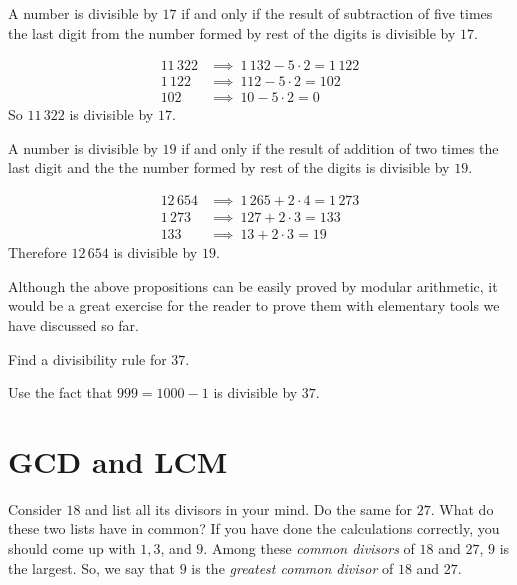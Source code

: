 \documentclass{subfile}
\begin{document}
	\begin{proposition}[Divisibility by $17$]
		A number is divisible by $17$ if and only if the result of subtraction of five times the last digit from the number formed by rest of the digits is divisible by $17$.
	\end{proposition}

	\begin{example}
		\begin{align*}
			11\, 322 & \implies \ 1\, 132 - 5 \cdot 2 = 1\, 122 \\
			1\, 122 & \implies  \ 112 - 5 \cdot 2 =   102 \\
			102 & \implies \ 10 - 5 \cdot 2 =  0
		\end{align*}
		So $11\, 322$ is divisible by $17$.
	\end{example}

	\begin{proposition}[Divisibility by $19$]
		A number is divisible by $19$ if and only if the result of addition of two times the last digit and the the number formed by rest of the digits is divisible by $19$.
	\end{proposition}

	\begin{example}
		\begin{align*}
			12 \, 654 & \implies \ 1\, 265 + 2 \cdot 4 = 1\, 273 \\
			1\, 273 & \implies  \ 127 + 2 \cdot 3 =   133 \\
			133 & \implies \ 13 + 2 \cdot 3 =  19
		\end{align*}
		Therefore $12\, 654$ is divisible by $19$.
	\end{example}

	Although the above propositions can be easily proved by modular arithmetic, it would be a great exercise for the reader to prove them with elementary tools we have discussed so far.

	\begin{problem}
		Find a divisibility rule for $37$.
	\end{problem}

	\begin{hint}
		Use the fact that $999=1000-1$ is divisible by $37$.
	\end{hint}

	\section{GCD and LCM}\label{sec:gcd-lcm}
	Consider $18$ and list all its divisors in your mind. Do the same for $27$. What do these two lists have in common? If you have done the calculations correctly, you should come up with $1,3$, and $9$. Among these \textit{common divisors} of $18$ and $27$, $9$ is the largest. So, we say that $9$ is the \textit{greatest common divisor} of $18$ and $27$.
\end{document}
